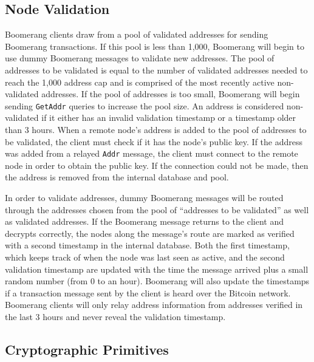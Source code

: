 \subsection{Node Validation} \label{sec:validation}
Boomerang clients draw from a pool of validated addresses for sending Boomerang transactions. If this pool is less than 1,000, Boomerang will begin to use dummy Boomerang messages to validate new addresses. The pool of addresses to be validated is equal to the number of validated addresses needed to reach the 1,000 address cap and is comprised of the most recently active non-validated addresses. If the pool of addresses is too small, Boomerang will begin sending {\tt GetAddr} queries to increase the pool size. An address is considered non-validated if it either has an invalid validation timestamp or a timestamp older than 3 hours. When a remote node's address is added to the pool of addresses to be validated, the client must check if it has the node's public key. If the address was added from a relayed {\tt Addr} message, the client must connect to the remote node in order to obtain the public key. If the connection could not be made, then the address is removed from the internal database and pool.

In order to validate addresses, dummy Boomerang messages will be routed through the addresses chosen from the pool of “addresses to be validated” as well as validated addresses. If the Boomerang message returns to the client and decrypts correctly, the nodes along the message's route are marked as verified with a second timestamp in the internal database. Both the first timestamp, which keeps track of when the node was last seen as active, and the second validation timestamp are updated with the time the message arrived plus a small random number (from 0 to an hour). Boomerang will also update the timestamps if a transaction message sent by the client is heard over the Bitcoin network. Boomerang clients will only relay address information from addresses verified in the last 3 hours and never reveal the validation timestamp.

\subsection{Cryptographic Primitives} \label{sec:crypto}

